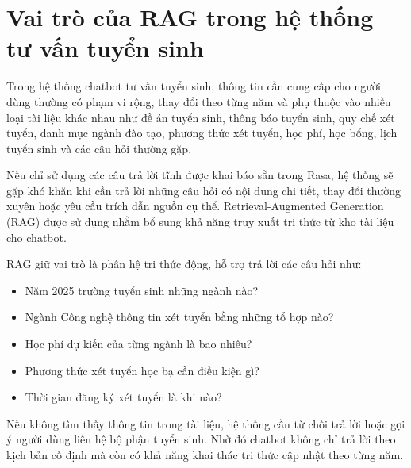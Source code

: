 ﻿\section{Vai trò của RAG trong hệ thống tư vấn tuyển sinh}

Trong hệ thống chatbot tư vấn tuyển sinh, thông tin cần cung cấp cho người dùng thường có phạm vi rộng, thay đổi theo từng năm và phụ thuộc vào nhiều loại tài liệu khác nhau như đề án tuyển sinh, thông báo tuyển sinh, quy chế xét tuyển, danh mục ngành đào tạo, phương thức xét tuyển, học phí, học bổng, lịch tuyển sinh và các câu hỏi thường gặp.

Nếu chỉ sử dụng các câu trả lời tĩnh được khai báo sẵn trong Rasa, hệ thống sẽ gặp khó khăn khi cần trả lời những câu hỏi có nội dung chi tiết, thay đổi thường xuyên hoặc yêu cầu trích dẫn nguồn cụ thể. Retrieval-Augmented Generation (RAG) được sử dụng nhằm bổ sung khả năng truy xuất tri thức từ kho tài liệu cho chatbot.

RAG giữ vai trò là phân hệ tri thức động, hỗ trợ trả lời các câu hỏi như:
\begin{itemize}
    \item Năm 2025 trường tuyển sinh những ngành nào?
    \item Ngành Công nghệ thông tin xét tuyển bằng những tổ hợp nào?
    \item Học phí dự kiến của từng ngành là bao nhiêu?
    \item Phương thức xét tuyển học bạ cần điều kiện gì?
    \item Thời gian đăng ký xét tuyển là khi nào?
\end{itemize}

Nếu không tìm thấy thông tin trong tài liệu, hệ thống cần từ chối trả lời hoặc gợi ý người dùng liên hệ bộ phận tuyển sinh. Nhờ đó chatbot không chỉ trả lời theo kịch bản cố định mà còn có khả năng khai thác tri thức cập nhật theo từng năm.
